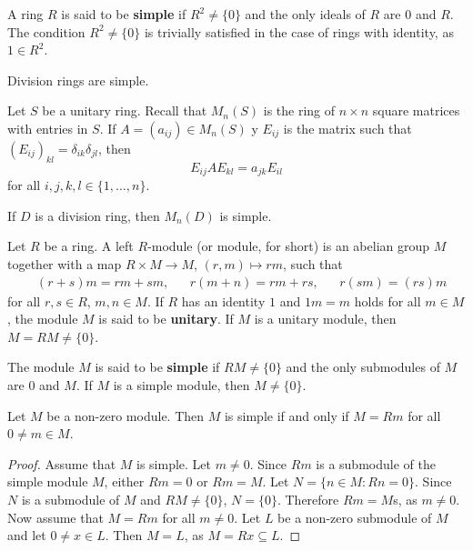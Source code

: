 A ring $R$ is said to be \textbf{simple} if $R^2\ne\{0\}$ and the only ideals of 
$R$ are $0$ and $R$. The condition $R^2\ne\{0\}$ is trivially satisfied in the case of rings
with identity, as $1\in R^2$. 

\begin{example}
	Division rings are simple.
\end{example}

Let $S$ be a unitary ring. Recall that $M_n(S)$ is the ring of $n\times n$ square matrices 
with entries in $S$.  If $A=(a_{ij})\in M_n(S)$ y $E_{ij}$ is the matrix
such that $(E_{ij})_{kl}=\delta_{ik}\delta_{jl}$, then
\begin{equation}
	\label{eq:trick}
E_{ij}AE_{kl}=a_{jk}E_{il}
\end{equation}
for all $i,j,k,l\in\{1,\dots,n\}$. 

\begin{exercise}
	If $D$ is a division ring, then $M_n(D)$ is simple. 
\end{exercise}

Let $R$ be a ring. A left $R$-module (or module, for short)  
is an abelian group $M$ together with a map $R\times M\to M$, $(r,m)\mapsto rm$, such that
\begin{align*}
&(r+s)m=rm+sm, &&
r(m+n)=rm+rs, && r(sm)=(rs)m    
\end{align*}
for all $r,s\in R$, $m,n\in M$.  If $R$ has an identity 
$1$ and $1m=m$ holds for all $m\in M$, the module $M$ is said to be 
\textbf{unitary}.  If $M$ is a unitary module, then $M=RM\ne\{0\}$.


The module $M$ is said to be 
\textbf{simple} if $RM\ne\{0\}$ and the only submodules of $M$ are $0$ and $M$.
If $M$ is a simple module, then $M\ne\{0\}$.


\begin{lemma}
	\label{lemma:simple}
	Let $M$ be a non-zero module. Then $M$ is simple if and only if $M=Rm$
	for all $0\ne m\in M$.
\end{lemma}

\begin{proof}
	Assume that $M$ is simple.  Let $m\ne 0$. Since $Rm$ is a submodule of the simple 
	module $M$, either $Rm=0$ or $Rm=M$.  Let $N=\{n\in M:Rn=0\}$. Since $N$ is a 
	submodule of $M$ and $RM\ne\{0\}$, $N=\{0\}$. Therefore $Rm=M$s, as $m\ne0$.
	Now assume that $M=Rm$ for all $m\ne0$. Let $L$ be a non-zero submodule of 
	$M$ and let $0\ne x\in L$. Then $M=L$, as $M=Rx\subseteq L$. 
\end{proof} 

